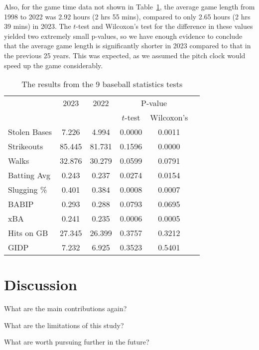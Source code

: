 \documentclass[12pt]{article}
\begin{document}
Also, for the game time data not shown in Table~\ref{tab:table1}, the average game
length from 1998 to 2022 was 2.92 hours (2 hrs 55 mins), compared to only 2.65 hours
(2 hrs 39 mins) in 2023. The \(t\)-test and Wilcoxon's test for the difference in
these values yielded two extremely small p-values, so we have enough evidence to 
conclude that the average game length is significantly shorter in 2023 compared to
that in the previous 25 years. This was expected, as we assumed the pitch clock would
speed up the game considerably.

\begin{table}[tbp]
  \caption{The results from the 9 baseball statistics tests}
  \label{tab:table1}
  \centering
  \begin{tabular}[t]{lccccc}
    \toprule
    & 2023 & 2022 & \multicolumn{2}{c}{P-value}\\
    \cmidrule(lr){4-5}
    &          &                & \(t\)-test & Wilcoxon's\\
    \midrule
    Stolen Bases & 7.226 & 4.994 & 0.0000 & 0.0011 \\ 
    Strikeouts & 85.445 & 81.731 & 0.1596 & 0.0000 \\ 
    Walks & 32.876 & 30.279 & 0.0599 & 0.0791 \\ 
    Batting Avg & 0.243 & 0.237 & 0.0274 & 0.0154 \\ 
    Slugging \% & 0.401 & 0.384 & 0.0008 & 0.0007 \\ 
    BABIP & 0.293 & 0.288 & 0.0793 & 0.0695 \\ 
    xBA & 0.241 & 0.235 & 0.0006 & 0.0005 \\ 
    Hits on GB & 27.345 & 26.399 & 0.3757 & 0.3212 \\ 
    GIDP & 7.232 & 6.925 & 0.3523 & 0.5401 \\ 
    \bottomrule
  \end{tabular}
\end{table}


\section{Discussion}
\label{sec:disc}

What are the main contributions again?

What are the limitations of this study?

What are worth pursuing further in the future?




\end{document}
